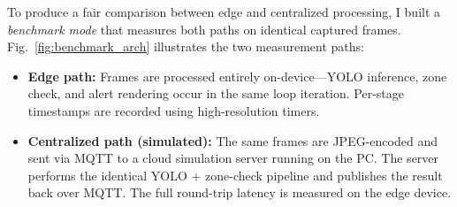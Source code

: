 \documentclass[conference]{IEEEtran}
\begin{document}
To produce a fair comparison between edge and centralized processing, I built a \textit{benchmark mode} that measures both paths on identical captured frames. Fig.~\ref{fig:benchmark_arch} illustrates the two measurement paths:

\begin{itemize}
    \item \textbf{Edge path:} Frames are processed entirely on-device---YOLO inference, zone check, and alert rendering occur in the same loop iteration. Per-stage timestamps are recorded using high-resolution timers.
    \item \textbf{Centralized path (simulated):} The same frames are JPEG-encoded and sent via MQTT to a cloud simulation server running on the PC. The server performs the identical YOLO + zone-check pipeline and publishes the result back over MQTT. The full round-trip latency is measured on the edge device.
\end{itemize}
\end{document}
